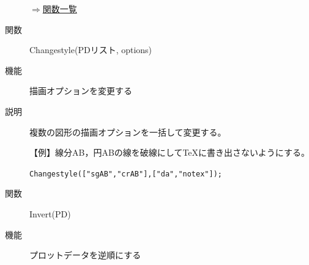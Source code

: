 \documentclass[papersize,a4paper,12pt,uplatex]{jsarticle}
\begin{document}
\begin{description}
%
%
%
%

\begin{flushright}\hyperlink{functionlist}{$\Rightarrow$関数一覧}\end{flushright}

\hypertarget{changestyle}{}
\item[関数]Changestyle(PDリスト, options)
\item[機能]描画オプションを変更する
\item[説明]複数の図形の描画オプションを一括して変更する。

\vspace{\baselineskip}
【例】線分AB，円ABの線を破線にして\TeX に書き出さないようにする。

\hspace{10mm} \verb|Changestyle(["sgAB","crAB"],["da","notex"]);|


\vspace{\baselineskip}
\hypertarget{invert}{}
\item[関数]Invert(PD)
\item[機能]プロットデータを逆順にする


\end{description}
\end{document}
